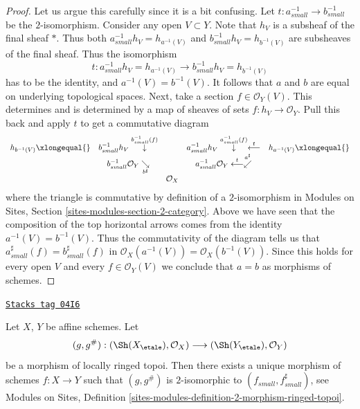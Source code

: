 \begin{proof}
Let us argue this carefully since it is a bit confusing.
Let $t : a_{small}^{-1} \to b_{small}^{-1}$ be the $2$-isomorphism.
Consider any open $V \subset Y$. Note that $h_V$ is a subsheaf of the
final sheaf $*$. Thus both $a_{small}^{-1}h_V = h_{a^{-1}(V)}$
and $b_{small}^{-1}h_V = h_{b^{-1}(V)}$ are subsheaves of the final sheaf.
Thus the isomorphism
$$
t : a_{small}^{-1}h_V = h_{a^{-1}(V)} \to b_{small}^{-1}h_V = h_{b^{-1}(V)}
$$
has to be the identity, and $a^{-1}(V) = b^{-1}(V)$.
It follows that $a$ and $b$ are equal on underlying topological spaces.
Next, take a section $f \in \mathcal{O}_Y(V)$. This determines and
is determined by a map of sheaves of sets
$f : h_V \to \mathcal{O}_Y$.
Pull this back and apply $t$ to get a commutative diagram
$$
\begin{array}{ccccc}h_{b^{-1}(V)} \xlongequal{} & b_{small}^{-1}h_V \overset{b_{small}^{-1}(f)}{\downarrow} &  & a_{small}^{-1}h_V \overset{a_{small}^{-1}(f)}{\downarrow}\overset{t}{\longleftarrow} & h_{a^{-1}(V)} \xlongequal{} \\  & b_{small}^{-1}\mathcal{O}_Y
\underset{b^\sharp}{\searrow} &  & a_{small}^{-1}\mathcal{O}_Y \overset{t}{\longleftarrow}\overset{a^\sharp}{\swarrow} &  \\  &  & \mathcal{O}_X &  & \end{array}
$$
where the triangle is commutative by definition of a $2$-isomorphism in
Modules on Sites, Section \ref{sites-modules-section-2-category}.
Above we have seen that the composition of the top horizontal
arrows comes from the identity $a^{-1}(V) = b^{-1}(V)$.
Thus the commutativity of the diagram tells us that
$a_{small}^\sharp(f) = b_{small}^\sharp(f)$ in
$\mathcal{O}_X(a^{-1}(V)) = \mathcal{O}_X(b^{-1}(V))$.
Since this holds for every open $V$ and every $f \in \mathcal{O}_Y(V)$
we conclude that $a = b$ as morphisms of schemes.
\end{proof}

\begin{lemma}
\label{etale-cohomology-lemma-morphism-ringed-etale-topoi-affines}
\href{https://stacks.math.columbia.edu/tag/04I6}{\texttt{Stacks tag 04I6}}

Let $X$, $Y$ be affine schemes.
Let
$$
(g, g^\#) :
(\Sh(X_\etale), \mathcal{O}_X)
\longrightarrow
(\Sh(Y_\etale), \mathcal{O}_Y)
$$
be a morphism of locally ringed topoi. Then there exists a
unique morphism of schemes $f : X \to Y$ such that
$(g, g^\#)$ is $2$-isomorphic to $(f_{small}, f_{small}^\sharp)$,
see
Modules on Sites,
Definition \ref{sites-modules-definition-2-morphism-ringed-topoi}.
\end{lemma}

